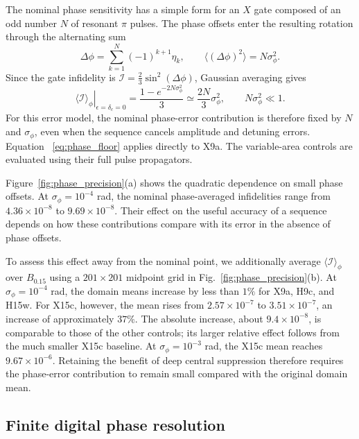 \documentclass[10pt,aps,twocolumn,pra,floatfix,superscriptaddress]{revtex4-2}
\begin{document}
The nominal phase sensitivity has a simple form for an
$X$ gate composed of an odd number $N$ of resonant $\pi$
pulses. The phase offsets enter the resulting rotation
through the alternating sum
\begin{equation}
\Delta\phi=\sum_{k=1}^{N}(-1)^{k+1}\eta_k,
\qquad
\langle(\Delta\phi)^2\rangle=N\sigma_\phi^2.
\end{equation}
Since the gate infidelity is
$\mathcal I=\tfrac23\sin^2(\Delta\phi)$, Gaussian averaging
gives
\begin{equation}
\left.\langle\mathcal I\rangle_\phi\right|_{\epsilon=\delta_c=0}
=\frac{1-e^{-2N\sigma_\phi^2}}{3}
\simeq\frac{2N}{3}\sigma_\phi^2,
\qquad N\sigma_\phi^2\ll1.
\label{eq:phase_floor}
\end{equation}
For this error model, the nominal phase-error contribution
is therefore fixed by $N$ and $\sigma_\phi$, even when the
sequence cancels amplitude and detuning errors. Equation~
\eqref{eq:phase_floor} applies directly to X9a. The
variable-area controls are evaluated using their full pulse propagators.

Figure~\ref{fig:phase_precision}(a) shows the quadratic
dependence on small phase offsets. At
$\sigma_\phi=10^{-4}$ rad, the nominal phase-averaged
infidelities range from $4.36\times10^{-8}$ to
$9.69\times10^{-8}$. Their effect on the useful accuracy of a sequence depends on how these contributions compare with its error in the absence of phase offsets.

To assess this effect away from the nominal point, we
additionally average $\langle\mathcal I\rangle_\phi$ over
$B_{0.15}$ using a $201\times201$ midpoint grid
in Fig.~\ref{fig:phase_precision}(b). At
$\sigma_\phi=10^{-4}$ rad, the domain means increase by
less than $1\%$ for X9a, H9c, and H15w. For X15c, however,
the mean rises from $2.57\times10^{-7}$ to
$3.51\times10^{-7}$, an increase of approximately $37\%$.
The absolute increase, about $9.4\times10^{-8}$, is
comparable to those of the other controls; its larger
relative effect follows from the much smaller X15c
baseline. At $\sigma_\phi=10^{-3}$ rad, the X15c mean
reaches $9.67\times10^{-6}$. Retaining the benefit of
deep central suppression therefore requires the phase-error contribution to remain small compared with the original domain mean.

\subsection{Finite digital phase resolution}
\end{document}
